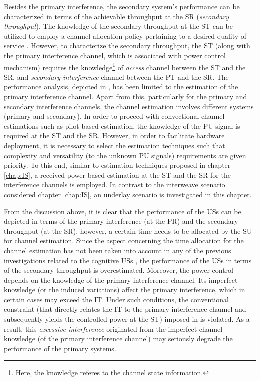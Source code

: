 Besides the primary interference, the secondary system's performance can be characterized in terms of the achievable throughput at the SR (\textit{secondary throughput}). The knowledge of the secondary throughput at the ST can be utilized to employ a channel allocation policy pertaining to a desired quality of service \cite{Lien10}. However, to characterize the secondary throughput, the ST (along with the primary interference channel, which is associated with power control mechanism) requires the knowledge\footnote{Here, the knowledge referes to the channel state information.} of \textit{access} channel between the ST and the SR, and \textit{secondary interference} channel between the PT and the SR. The performance analysis, depicted in \cite{Kaushik15, Musa09, Suraweera10, Kim12}, has been limited to the estimation of the primary interference channel. Apart from this, particularly for the primary and secondary interference channels, the channel estimation involves different systems (primary and secondary). In order to proceed with convectional channel estimations such as pilot-based estimation, the knowledge of the PU signal is required at the ST and the SR. However, in order to facilitate hardware deployment, it is necessary to select the estimation techniques such that complexity and versatility (to the unknown PU signals) requirements are given priority. To this end, similar to estimation techniques proposed in chapter \ref{chap:IS}, a received power-based estimation at the ST and the SR for the interference channels is employed. In contrast to the interweave scenario considered chapter \ref{chap:IS}, an underlay scenario is investigated in this chapter.   

From the discussion above, it is clear that the performance of the USs can be depicted in terms of the primary interference (at the PR) and the secondary throughput (at the SR), however, a certain time needs to be allocated by the SU for channel estimation. Since the aspect concerning the time allocation for the channel estimation has not been taken into account in any of the previous investigations related to the cognitive USs \cite{Musa09, Suraweera10, Kim12}, the performance of the USs in terms of the secondary throughput is overestimated. Moreover, the power control depends on the knowledge of the primary interference channel. Its imperfect knowledge (or the induced variations) affect the primary interference, which in certain cases may exceed the IT. Under such conditions, the conventional constraint (that directly relates the IT to the primary interference channel and subsequently yields the controlled power at the ST) imposed in \cite{Xing07, Ghasemi07, Kang09} is violated. As a result, this \textit{excessive interference} originated from the imperfect channel knowledge (of the primary interference channel) may seriously degrade the performance of the primary systems. 

